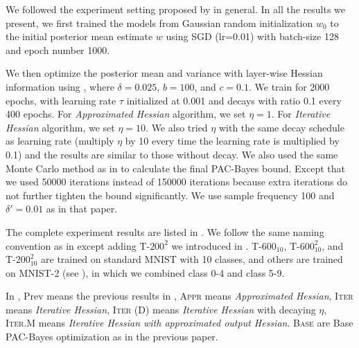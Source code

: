 We followed the experiment setting proposed by \citet{dziugaite2017computing} in general. In all the results we present, we first trained the models from Gaussian random initialization $w_0$ to the initial posterior mean estimate $w$ using SGD (lr=0.01) with batch-size 128 and epoch number 1000.

We then optimize the posterior mean and variance with layer-wise Hessian information using ,
where $\delta = 0.025$, $b=100$, and $c=0.1$.
We train for 2000 epochs, with learning rate $\tau$ initialized at 0.001 and decays with ratio 0.1 every 400 epochs. For \emph{Approximated Hessian} algorithm, we set $\eta=1$. For \emph{Iterative Hessian} algorithm, we set $\eta=10$. We also tried $\eta$ with the same decay schedule as learning rate (multiply $\eta$ by 10 every time the learning rate is multiplied by 0.1) and the results are similar to those without decay.
We also used the same Monte Carlo method as in \citet{dziugaite2017computing} to calculate the final PAC-Bayes bound. Except that we used 50000 iterations instead of 150000 iterations because extra iterations do not further tighten the bound significantly. We use sample frequency 100 and $\delta'=0.01$ as in that paper.

The complete experiment results are listed in . We follow the same naming convention as in \citet{dziugaite2017computing} except adding T-$200^2$ we introduced in . T-$600_{10}$, T-$600^2_{10}$, and T-$200^2_{10}$ are trained on standard MNIST with 10 classes, and others are trained on MNIST-2 (see ), in which we combined class 0-4 and class 5-9.

In , Prev means the previous results in \citet{dziugaite2017computing}, \textsc{Appr} means \emph{Approximated Hessian}, \textsc{Iter} means \emph{Iterative Hessian}, \textsc{Iter} (D) means \emph{Iterative Hessian} with decaying $\eta$, \textsc{Iter.M} means \emph{Iterative Hessian with approximated output Hessian}. \textsc{Base} are Base PAC-Bayes optimization as in the previous paper.

